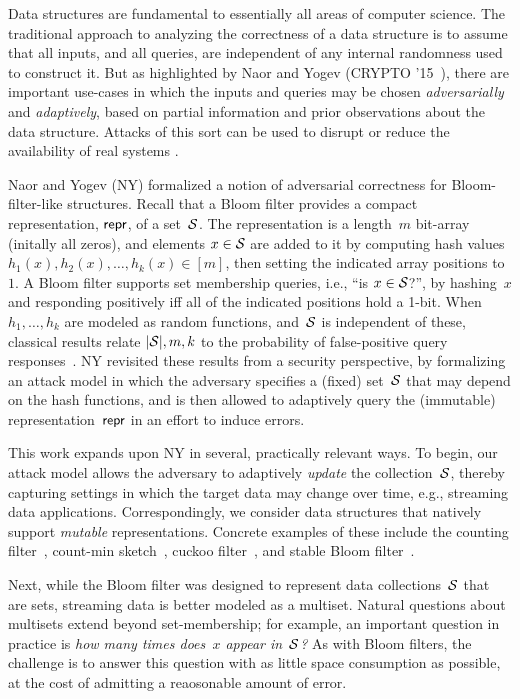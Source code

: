 Data structures are fundamental to essentially all areas of computer science.
The traditional approach to analyzing the correctness of a data structure is to
assume that all inputs, and all queries, are independent of any internal
randomness used to construct it.  But as highlighted by Naor and
Yogev (CRYPTO '15~\cite{naor2015bloom}), there are important use-cases in which the inputs
and queries may be chosen \emph{adversarially} and \emph{adaptively}, based on
partial information and prior observations about the data structure. Attacks of
this sort can be used to disrupt or reduce the availability of real systems
\cite{crosby2003denial,gerbet2015power,lipton1993clocked}.

Naor and Yogev (NY) formalized a notion of adversarial correctness for
Bloom-filter-like structures. Recall that a Bloom filter provides a compact
representation, $\mathsf{repr}$, of a set~$\mathcal{S}$. The representation is a length~$m$
bit-array (initally all zeros), and elements $x \in \mathcal{S}$ are added to it by
computing hash values $h_1(x),h_2(x),\ldots,h_k(x)\in [m]$, then setting the
indicated array positions to~$1$.  A Bloom filter supports set membership
queries, i.e., ``is $x\in\mathcal{S}$?'', by hashing~$x$ and responding positively
iff all of the indicated positions hold a 1-bit.  When $h_1,\ldots,h_k$ are
modeled as random functions, and~$\mathcal{S}$ is independent of these, classical
results relate $|\mathcal{S}|,m,k$ to the probability of false-positive query
responses~\cite{broder2004network,kirsch2006less}.
%
NY revisited these results from a security perspective, by
formalizing an attack model in which the adversary specifies a
(fixed) set~$\mathcal{S}$ that may
depend on the hash functions, and is then allowed to adaptively query the
(immutable) representation~$\mathsf{repr}$ in an effort to induce errors.

This work expands upon NY in several, practically relevant ways.  To begin, our
attack model allows the adversary to adaptively \emph{update} the
collection~$\mathcal{S}$, thereby capturing settings in which the target data may
change over time, e.g., streaming data applications.  Correspondingly, we
consider data structures that natively support \emph{mutable} representations.
Concrete examples of these include the counting filter~\cite{fan2000summary},
count-min sketch~\cite{cormode2005improved}, cuckoo filter~\cite{fan2014cuckoo},
and stable Bloom filter~\cite{deng2006approximately}.

%
Next, while the Bloom filter was designed to represent data collections~$\mathcal{S}$
that are sets, streaming data is better modeled as a multiset.  Natural
questions about multisets extend beyond set-membership; for example, an
important question in practice is \emph{how many times does~$x$ appear
in~$\mathcal{S}$?} As with Bloom filters, the challenge is to answer this question with
as little space consumption as possible, at the cost of admitting a reaosonable
amount of error.

